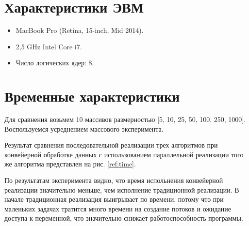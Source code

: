 \documentclass[12pt]{report}
\begin{document}
\section{Характеристики ЭВМ}

\begin{itemize}
	\item MacBook Pro (Retina, 15-inch, Mid 2014).
	\item 2,5 GHz Intel Core i7.
	\item Число логических ядер: 8.
\end{itemize}

\section{Временные характеристики} 

Для сравнения возьмем 10 массивов размерностью
$[$5, 10, 25, 50, 100, 250, 1000$]$.
Воспользуемся усреднением массового эксперимента.

Результат сравнения последовательной реализации трех алгоритмов
при конвейерной обработке данных с использованием параллельной реализации того же алгоритма представлен на рис. \ref{ref:time}.

\begin{figure}[ht!]
\end{figure}

По результатам эксперимента видно, что время испольнения конвейерной
реализации значительно меньше, чем исполнение традиционной реализации.
В начале традиционная реализация выигрывает по времени, потому что
при маленьких задачах тратится много времени на создание потоков и
ожидание доступа к переменной, что значительно снижает
работоспособность программы.
\end{document}
